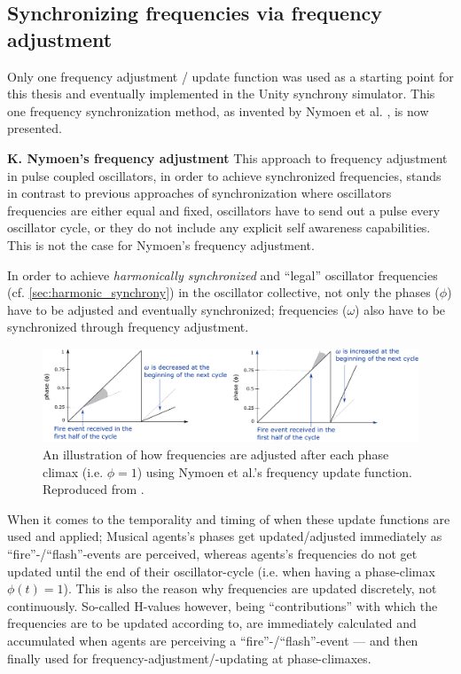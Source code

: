 	\subsection{Synchronizing frequencies via frequency adjustment}

	Only one frequency adjustment / update function was used as a starting point for this thesis and eventually implemented in the Unity synchrony simulator. This one frequency synchronization method, as invented by Nymoen et al. \cite{nymoen_synch}, is now presented. \nl

	\textbf{K. Nymoen's frequency adjustment} \nl
	This approach to frequency adjustment in pulse coupled oscillators, in order to achieve synchronized frequencies, stands in contrast to previous approaches of synchronization where oscillators frequencies are either equal and fixed, oscillators have to send out a pulse every oscillator cycle, or they do not include any explicit self awareness capabilities. This is not the case for Nymoen's frequency adjustment.

	In order to achieve \textit{harmonically synchronized} and ``legal'' oscillator frequencies (cf. \ref{sec:harmonic_synchrony}) in the oscillator collective, not only the phases ($\phi$) have to be adjusted and eventually synchronized; frequencies ($\omega$) also have to be synchronized through frequency adjustment.
	
	\begin{figure}[ht!]
		\centering
		\includegraphics[width=\linewidth]{Assets/DocSegments/Chapters/Baseline/Figures/Illustrations/NymoenFrequencyAdjustment.pdf}
		\caption[]{An illustration of how frequencies are adjusted after each phase climax (i.e. $\phi=1$) using Nymoen et al.'s frequency update function. Reproduced from \cite{nymoen_synch}.}
		\label{fig:nymoen_freq_adjust_illustration}
	\end{figure}
	
	
	When it comes to the temporality and timing of when these update functions are used and applied; Musical agents's phases get updated/adjusted immediately as ``fire''-/``flash''-events are perceived, whereas agents's frequencies do not get updated until the end of their oscillator-cycle (i.e. when having a phase-climax $\phi(t)=1$). This is also the reason why frequencies are updated discretely, not continuously. So-called H-values however, being ``contributions'' with which the frequencies are to be updated according to, are immediately calculated and accumulated when agents are perceiving a ``fire''-/``flash''-event — and then finally used for frequency-adjustment/-updating at phase-climaxes.
	
